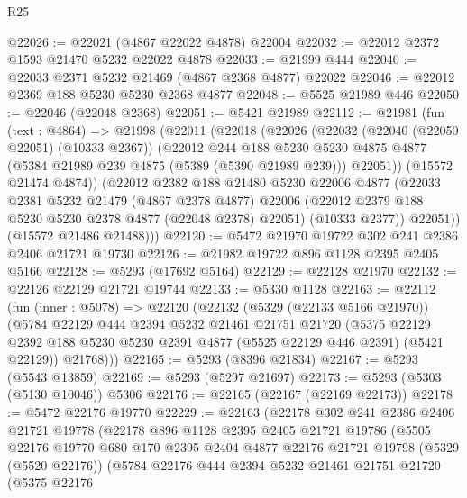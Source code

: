 \begin{lexlean}{R25}
\begin{coremodule}
@22026 := @22021 (@4867 @22022 @4878) @22004
@22032 := @22012 @2372 @1593 @21470 @5232 @22022 @4878
@22033 := @21999 @444
@22040 := @22033 @2371 @5232 @21469 (@4867 @2368 @4877) @22022
@22046 := @22012 @2369 @188 @5230 @5230 @2368 @4877
@22048 := @5525 @21989 @446
@22050 := @22046 (@22048 @2368)
@22051 := @5421 @21989
@22112 := @21981
    (fun (text : @4864) =>
    @21998
      (@22011
        (@22018
          (@22026
            (@22032
              (@22040 (@22050 @22051) (@10333 @2367))
              (@22012
                @244
                @188
                @5230
                @5230
                @4875
                @4877
                (@5384 @21989 @239 @4875 (@5389 (@5390 @21989 @239)))
                @22051))
            (@15572 @21474 @4874))
          (@22012
            @2382
            @188
            @21480
            @5230
            @22006
            @4877
            (@22033
              @2381
              @5232
              @21479
              (@4867 @2378 @4877)
              @22006
              (@22012 @2379 @188 @5230 @5230 @2378 @4877 (@22048 @2378) @22051)
              (@10333 @2377))
            @22051))
        (@15572 @21486 @21488)))
@22120 := @5472 @21970 @19722 @302 @241 @2386 @2406 @21721 @19730
@22126 := @21982 @19722 @896 @1128 @2395 @2405 @5166
@22128 := @5293 (@17692 @5164)
@22129 := @22128 @21970
@22132 := @22126 @22129 @21721 @19744
@22133 := @5330 @1128
@22163 := @22112
    (fun (inner : @5078) =>
    @22120
      (@22132
        (@5329 (@22133 @5166 @21970))
        (@5784
          @22129
          @444
          @2394
          @5232
          @21461
          @21751
          @21720
          (@5375 @22129 @2392 @188 @5230 @5230 @2391 @4877 (@5525 @22129 @446 @2391) (@5421 @22129))
          @21768)))
@22165 := @5293 (@8396 @21834)
@22167 := @5293 (@5543 @13859)
@22169 := @5293 (@5297 @21697)
@22173 := @5293 (@5303 (@5130 @10046)) @5306
@22176 := @22165 (@22167 (@22169 @22173))
@22178 := @5472 @22176 @19770
@22229 := @22163
    (@22178
      @302
      @241
      @2386
      @2406
      @21721
      @19778
      (@22178
        @896
        @1128
        @2395
        @2405
        @21721
        @19786
        (@5505
          @22176
          @19770
          @680
          @170
          @2395
          @2404
          @4877
          @22176
          @21721
          @19798
          (@5329 (@5520 @22176))
          (@5784
            @22176
            @444
            @2394
            @5232
            @21461
            @21751
            @21720
            (@5375
              @22176

\end{coremodule}
\end{lexlean}
